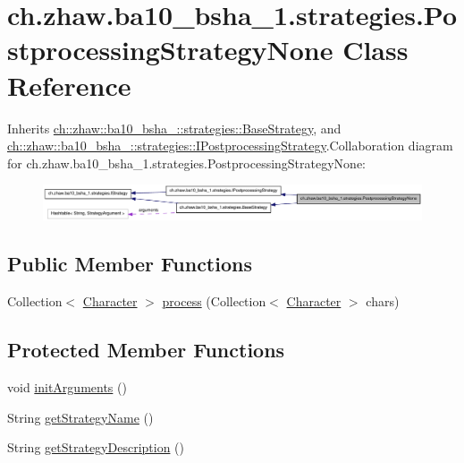 \hypertarget{classch_1_1zhaw_1_1ba10__bsha__1_1_1strategies_1_1PostprocessingStrategyNone}{
\section{ch.zhaw.ba10\_\-bsha\_\-1.strategies.PostprocessingStrategyNone Class Reference}
\label{classch_1_1zhaw_1_1ba10__bsha__1_1_1strategies_1_1PostprocessingStrategyNone}
}


Inherits \hyperlink{classch_1_1zhaw_1_1ba10__bsha__1_1_1strategies_1_1BaseStrategy}{ch::zhaw::ba10\_\-bsha\_::strategies::BaseStrategy}, and \hyperlink{interfacech_1_1zhaw_1_1ba10__bsha__1_1_1strategies_1_1IPostprocessingStrategy}{ch::zhaw::ba10\_\-bsha\_::strategies::IPostprocessingStrategy}.Collaboration diagram for ch.zhaw.ba10\_\-bsha\_\-1.strategies.PostprocessingStrategyNone:\nopagebreak
\begin{figure}[H]
\begin{center}
\leavevmode
\includegraphics[width=400pt]{classch_1_1zhaw_1_1ba10__bsha__1_1_1strategies_1_1PostprocessingStrategyNone__coll__graph}
\end{center}
\end{figure}
\subsection*{Public Member Functions}
\begin{DoxyCompactItemize}
\item 
Collection$<$ \hyperlink{classch_1_1zhaw_1_1ba10__bsha__1_1_1Character}{Character} $>$ \hyperlink{classch_1_1zhaw_1_1ba10__bsha__1_1_1strategies_1_1PostprocessingStrategyNone_af9183ec4f0802402cde7f97f746c7874}{process} (Collection$<$ \hyperlink{classch_1_1zhaw_1_1ba10__bsha__1_1_1Character}{Character} $>$ chars)
\end{DoxyCompactItemize}
\subsection*{Protected Member Functions}
\begin{DoxyCompactItemize}
\item 
void \hyperlink{classch_1_1zhaw_1_1ba10__bsha__1_1_1strategies_1_1PostprocessingStrategyNone_a183d171167e2352ce8679354292d137b}{initArguments} ()
\item 
String \hyperlink{classch_1_1zhaw_1_1ba10__bsha__1_1_1strategies_1_1PostprocessingStrategyNone_a6c5447b46c9ddb6add9d5f3f21ac7721}{getStrategyName} ()
\item 
String \hyperlink{classch_1_1zhaw_1_1ba10__bsha__1_1_1strategies_1_1PostprocessingStrategyNone_aa6732900e4c07b57f238da6134c8405a}{getStrategyDescription} ()
\end{DoxyCompactItemize}


